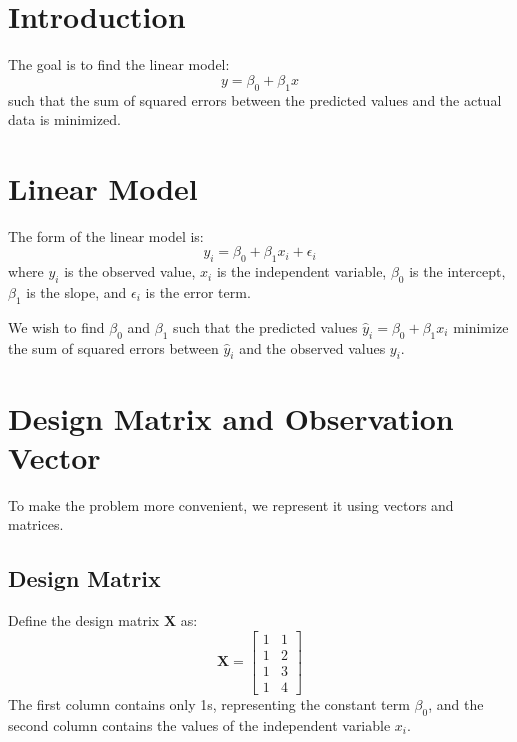 \section{Introduction}

The goal is to find the linear model:
\begin{equation}
    y = \beta_0 + \beta_1 x
\end{equation}
such that the sum of squared errors between the predicted values and the actual data is minimized.

\section{Linear Model}

The form of the linear model is:
\begin{equation}
    y_i = \beta_0 + \beta_1 x_i + \epsilon_i
\end{equation}
where $y_i$ is the observed value, $x_i$ is the independent variable, $\beta_0$ is the intercept, $\beta_1$ is the slope, and $\epsilon_i$ is the error term.

We wish to find $\beta_0$ and $\beta_1$ such that the predicted values $\hat{y}_i = \beta_0 + \beta_1 x_i$ minimize the sum of squared errors between $\hat{y}_i$ and the observed values $y_i$.

\section{Design Matrix and Observation Vector}

To make the problem more convenient, we represent it using vectors and matrices.

\subsection{Design Matrix}

Define the design matrix $\mathbf{X}$ as:
\begin{equation}
    \mathbf{X} = \begin{bmatrix}
        1 & 1 \\
        1 & 2 \\
        1 & 3 \\
        1 & 4
    \end{bmatrix}
\end{equation}
The first column contains only 1s, representing the constant term $\beta_0$, and the second column contains the values of the independent variable $x_i$.

